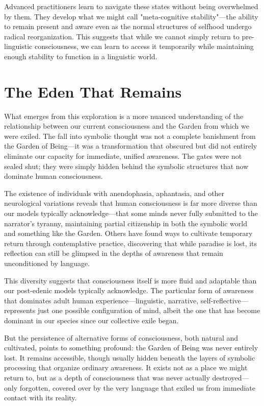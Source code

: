Advanced practitioners learn to navigate these states without being overwhelmed by them. They develop what we might call "meta-cognitive stability"—the ability to remain present and aware even as the normal structures of selfhood undergo radical reorganization. This suggests that while we cannot simply return to pre-linguistic consciousness, we can learn to access it temporarily while maintaining enough stability to function in a linguistic world.

\section{The Eden That Remains}

What emerges from this exploration is a more nuanced understanding of the relationship between our current consciousness and the Garden from which we were exiled. The fall into symbolic thought was not a complete banishment from the Garden of Being—it was a transformation that obscured but did not entirely eliminate our capacity for immediate, unified awareness. The gates were not sealed shut; they were simply hidden behind the symbolic structures that now dominate human consciousness.

The existence of individuals with anendophasia, aphantasia, and other neurological variations reveals that human consciousness is far more diverse than our models typically acknowledge—that some minds never fully submitted to the narrator's tyranny, maintaining partial citizenship in both the symbolic world and something like the Garden. Others have found ways to cultivate temporary return through contemplative practice, discovering that while paradise is lost, its reflection can still be glimpsed in the depths of awareness that remain unconditioned by language.

This diversity suggests that consciousness itself is more fluid and adaptable than our post-edenic models typically acknowledge. The particular form of awareness that dominates adult human experience—linguistic, narrative, self-reflective—represents just one possible configuration of mind, albeit the one that has become dominant in our species since our collective exile began.

But the persistence of alternative forms of consciousness, both natural and cultivated, points to something profound: the Garden of Being was never entirely lost. It remains accessible, though usually hidden beneath the layers of symbolic processing that organize ordinary awareness. It exists not as a place we might return to, but as a depth of consciousness that was never actually destroyed—only forgotten, covered over by the very language that exiled us from immediate contact with its reality.

